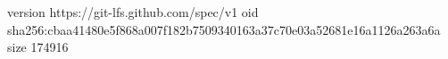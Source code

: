 version https://git-lfs.github.com/spec/v1
oid sha256:cbaa41480e5f868a007f182b7509340163a37c70e03a52681e16a1126a263a6a
size 174916
